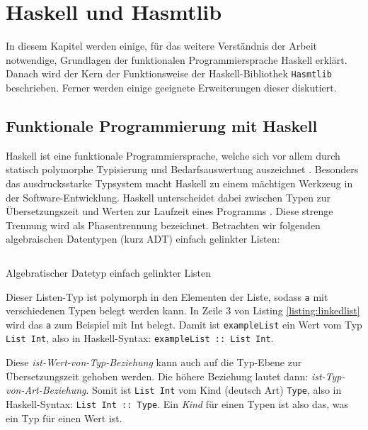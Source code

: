 \chapter{Haskell und Hasmtlib}
\label{chapter:haskell}
In diesem Kapitel werden einige, für das weitere Verständnis der Arbeit notwendige, Grundlagen der funktionalen Programmiersprache Haskell erklärt.
Danach wird der Kern der Funktionsweise der Haskell-Bibliothek \texttt{Hasmtlib} \cite{hasmtlib} beschrieben.
Ferner werden einige geeignete Erweiterungen dieser diskutiert.

\section{Funktionale Programmierung mit Haskell}
\label{sec:haskell}
Haskell ist eine funktionale Programmiersprache, welche sich vor allem durch statisch polymorphe Typisierung und Bedarfsauswertung auszeichnet \cite{haskell2010report}.
Besonders das ausdrucksstarke Typsystem macht Haskell zu einem mächtigen Werkzeug in der Software-Entwicklung.
Haskell unterscheidet dabei zwischen Typen zur Übersetzungszeit und Werten zur Laufzeit eines Programms \cite{singletons}.
Diese strenge Trennung wird als Phasentrennung bezeichnet.
Betrachten wir folgenden algebraischen Datentypen (kurz ADT) einfach gelinkter Listen:
\begin{listing}[H]
    \inputminted[linenos=true]{haskell}{Code/Implementierung/Haskell/List.hs}
    \caption{Algebratischer Datetyp einfach gelinkter Listen}
    \label{listing:linkedlist}
\end{listing}
Dieser Listen-Typ ist polymorph in den Elementen der Liste, sodass \texttt{a} mit verschiedenen Typen belegt werden kann.
In Zeile 3 von Listing \ref{listing:linkedlist} wird das \texttt{a} zum Beispiel mit Int belegt.
Damit ist \texttt{exampleList} ein Wert vom Typ \texttt{List Int}, also in Haskell-Syntax: \texttt{exampleList :: List Int}.

Diese \textit{ist-Wert-von-Typ-Beziehung} kann auch auf die Typ-Ebene zur Übersetzungszeit gehoben werden.
Die höhere Beziehung lautet dann: \textit{ist-Typ-von-Art-Beziehung}.
Somit ist \texttt{List Int} vom Kind (deutsch Art) \texttt{Type}, also in Haskell-Syntax: \texttt{List Int :: Type}.
Ein \textit{Kind} für einen Typen ist also das, was ein Typ für einen Wert ist.

